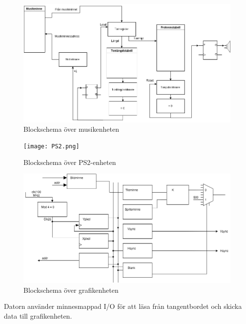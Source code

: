 \documentclass[a4paper,titlepage]{article}
\begin{document}
\begin{figure}[H]
	\centering
\includegraphics[width=14cm]{Musik.png}
	\caption{Blockschema över musikenheten}
\end{figure}

\begin{figure}[H]
	\centering
\texttt{[image: PS2.png]}
	\caption{Blockschema över PS2-enheten}
\end{figure}

\begin{figure}[H]
	\centering
\includegraphics[width=14cm]{vga-schema.png}
	\caption{Blockschema över grafikenheten}
\end{figure}

Datorn använder minnesmappad I/O för att läsa från tangentbordet och skicka data
till grafik\-enheten.
\end{document}
